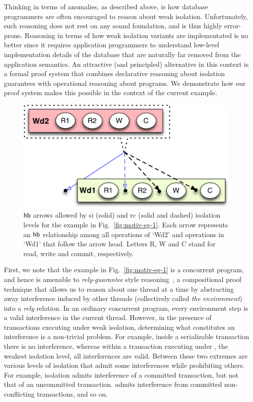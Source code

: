 Thinking in terms of anomalies, as described above, is how database
programmers are often encouraged to reason about weak isolation.
Unfortunately, such reasoning does not rest on any sound foundation,
and is thus highly error-prone. Reasoning in terms of how weak
isolation variants are implementated is no better since it requires
application programmers to understand low-level implementation details
of the database that are naturally far removed from the application
semantics. An attractive (and principled) alternative in this context
is a formal proof system that combines declarative reasoning about
isolation guarantees with operational reasoning about programs. We
demonstrate how our proof system makes this possible in the context of
the current example.

\begin{figure}
\centering
  \includegraphics[scale=0.4]{Figures/motiv-eg-1-hb}

\caption{$\textsf{hb}$ arrows allowed by {\sc si} (solid) and {\sc rc} (solid
  and dashed) isolation levels for the example in
  Fig.~\ref{fig:motiv-eg-1}. Each arrow represents an $\textsf{hb}$ relationship
  among all operations of `Wd2' and operations in `Wd1' that follow
  the arrow head. Letters R, W and C stand for read, write and commit,
  respectively.}
\label{fig:motiv-eg-1-hb}
\end{figure}

First, we note that the example in Fig.~\ref{fig:motiv-eg-1} is a
concurrent program, and hence is amenable to \emph{rely-guarantee}
style reasoning~\cite{rgjones}, a compositional proof technique that
allows us to reason about one thread at a time by abstracting away
interference induced by other threads (collectively called \emph{the
  environment}) into a \emph{rely} relation. In an ordinary concurrent
program, every environment step is a valid interference in the current
thread. However, in the presence of transactions executing under weak
isolation, determining what constitutes an interference is a
non-trivial problem. For example, inside a serializable transaction
there is no interference, whereas within a transaction executing under
, the weakest isolation level, all interferences
are valid. Between these two extremes are various levels of isolation
that admit some interferences while prohibiting others.  For example,
 isolation admits interference of a committed
transaction, but not that of an uncommitted transaction.
 admits interference from committed
non-conflicting transactions, and so on.

